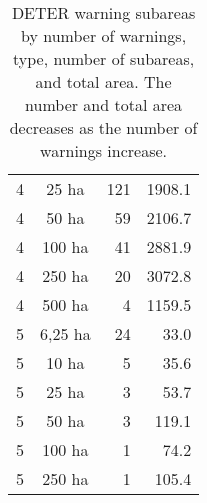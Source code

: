 \begin{table}[h]
\begin{tabular}{|c|c|r|r|}
4 & 25 ha     & 121   &     1908.1 \\
4 & 50 ha     & 59    &     2106.7 \\
4 & 100 ha    & 41    &     2881.9 \\
4 & 250 ha    & 20    &     3072.8 \\
4 & 500 ha    & 4     &     1159.5 \\
        \hline
5 & 6,25 ha   & 24    &       33.0 \\
5 & 10 ha     & 5     &       35.6 \\
5 & 25 ha     & 3     &       53.7 \\
5 & 50 ha     & 3     &      119.1 \\
5 & 100 ha    & 1     &       74.2 \\
5 & 250 ha    & 1     &      105.4 \\
        \hline
    \end{tabular}
    \caption{DETER warning subareas by number of warnings, type, number of 
    subareas, and total area. The number and total area decreases as the number
    of warnings increase.}
    \label{tab:warnings_subareas_by_number_area}
\end{table}
